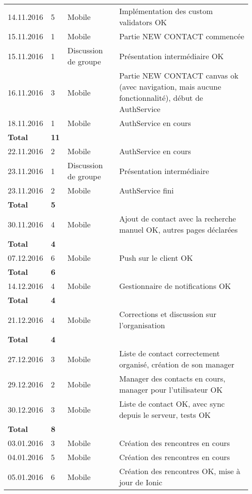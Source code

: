 \documentclass[french]{article}
\begin{document}
\begin{longtable}{p{}|p{}|p{}|p{}}
		14.11.2016 & 5 & Mobile & Implémentation des custom validators OK\\
		15.11.2016 & 1 & Mobile & Partie NEW CONTACT commencée\\
		15.11.2016 & 1 & Discussion de groupe & Présentation intermédiaire OK\\
		16.11.2016 & 3 & Mobile & Partie NEW CONTACT canvas ok (avec navigation, mais aucune fonctionnalité), début de AuthService\\
		18.11.2016 & 1 & Mobile & AuthService en cours\\
		\textbf{Total} & \textbf{11} &&\\
		\hline
		22.11.2016 & 2 & Mobile & AuthService en cours\\
		23.11.2016 & 1 & Discussion de groupe & Présentation intermédiaire\\
		23.11.2016 & 2 & Mobile & AuthService fini\\
		\textbf{Total} & \textbf{5} &&\\
		\hline
		30.11.2016 & 4 & Mobile & Ajout de contact avec la recherche manuel OK, autres pages déclarées\\
		\textbf{Total} & \textbf{4} &&\\
		\hline
		07.12.2016 & 6 & Mobile & Push sur le client OK\\
		\textbf{Total} & \textbf{6} &&\\
		\hline
		14.12.2016 & 4 & Mobile & Gestionnaire de notifications OK\\
		\textbf{Total} & \textbf{4} &&\\
		\hline
		21.12.2016 & 4 & Mobile & Corrections et discussion sur l'organisation\\
		\textbf{Total} & \textbf{4} &&\\
		\hline
		27.12.2016 & 3 & Mobile & Liste de contact correctement organisé, création de son manager\\
		29.12.2016 & 2 & Mobile & Manager des contacts en cours, manager pour l'utilisateur OK\\
		30.12.2016 & 3 & Mobile & Liste de contact OK, avec sync depuis le serveur, tests OK\\
		\textbf{Total} & \textbf{8} &&\\
		\hline
		03.01.2016 & 3 & Mobile & Création des rencontres en cours\\
		04.01.2016 & 5 & Mobile & Création des rencontres en cours\\
		05.01.2016 & 6 & Mobile & Création des rencontres OK, mise à jour de Ionic\\

\end{longtable}
\end{document}
